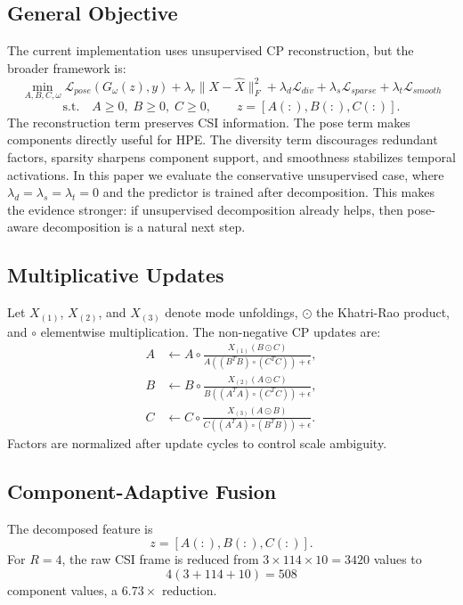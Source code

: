 \documentclass[letterpaper]{article}
\begin{document}
\subsection{General Objective}

The current implementation uses unsupervised CP reconstruction, but the broader framework is:
\begin{equation}
\min_{A,B,C,\omega}
\mathcal{L}_{pose}(G_\omega(z),y)
+\lambda_r\|X-\hat{X}\|_F^2
+\lambda_d\mathcal{L}_{div}
+\lambda_s\mathcal{L}_{sparse}
+\lambda_t\mathcal{L}_{smooth}
\label{eq:general_objective}
\end{equation}
\begin{equation}
\text{s.t.}\quad A\ge0,\;B\ge0,\;C\ge0,\qquad
z=[A(:),B(:),C(:)].
\end{equation}
The reconstruction term preserves CSI information. The pose term makes components directly useful for HPE. The diversity term discourages redundant factors, sparsity sharpens component support, and smoothness stabilizes temporal activations. In this paper we evaluate the conservative unsupervised case, where $\lambda_d=\lambda_s=\lambda_t=0$ and the predictor is trained after decomposition. This makes the evidence stronger: if unsupervised decomposition already helps, then pose-aware decomposition is a natural next step.

\subsection{Multiplicative Updates}

Let $X_{(1)}$, $X_{(2)}$, and $X_{(3)}$ denote mode unfoldings, $\odot$ the Khatri-Rao product, and $\circ$ elementwise multiplication. The non-negative CP updates are:
\begin{align}
A &\leftarrow A\circ
\frac{X_{(1)}(B\odot C)}
{A((B^TB)\circ(C^TC))+\epsilon},\\
B &\leftarrow B\circ
\frac{X_{(2)}(A\odot C)}
{B((A^TA)\circ(C^TC))+\epsilon},\\
C &\leftarrow C\circ
\frac{X_{(3)}(A\odot B)}
{C((A^TA)\circ(B^TB))+\epsilon}.
\end{align}
Factors are normalized after update cycles to control scale ambiguity.

\subsection{Component-Adaptive Fusion}

The decomposed feature is
\begin{equation}
z=[A(:),B(:),C(:)].
\end{equation}
For $R=4$, the raw CSI frame is reduced from $3\times114\times10=3420$ values to
\begin{equation}
4(3+114+10)=508
\end{equation}
component values, a $6.73\times$ reduction.
\end{document}
